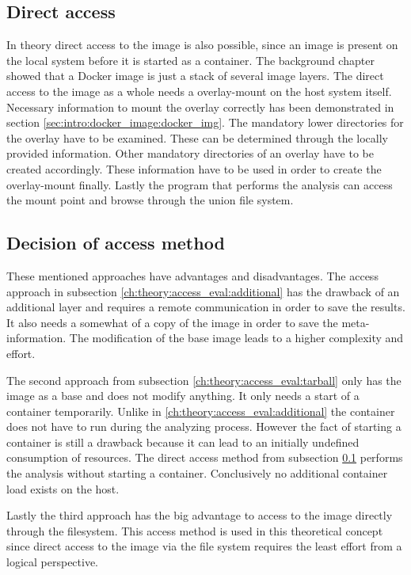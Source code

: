 \subsection{Direct access} 
\label{ch:theory:access_eval:direct_access}
In theory direct access to the image is also possible, since an image is present on the local system before it is started as a container.
The background chapter showed that a Docker image is just a stack of several image layers. 
The direct access to the image as a whole needs a overlay-mount on the host system itself.
Necessary information to mount the overlay correctly has been demonstrated in section \ref{sec:intro:docker_image:docker_img}.
The mandatory lower directories for the overlay have to be examined. 
These can be determined through the locally provided information.
Other mandatory directories of an overlay have to be created accordingly.
These information have to be used in order to create the overlay-mount finally. 
Lastly the program that performs the analysis can access the mount point and browse through the union file system.

\subsection{Decision of access method} 
\label{ch:theory:access_eval:decision_access}
These mentioned approaches have advantages and disadvantages. 	
The access approach in subsection \ref{ch:theory:access_eval:additional} has the drawback of an additional layer and requires a remote communication in order to save the results.
It also needs a somewhat of a copy of the image in order to save the meta-information. 
The modification of the base image leads to a higher complexity and effort. 

The second approach from subsection \ref{ch:theory:access_eval:tarball} only has the image as a base and does not modify anything. 
It only needs a start of a container temporarily. 
Unlike in \ref{ch:theory:access_eval:additional} the container does not have to run during the analyzing process. 
However the fact of starting a container is still a drawback because it can lead to an initially undefined consumption of resources.
The direct access method from subsection \ref{ch:theory:access_eval:direct_access} performs the analysis without starting a container. 
Conclusively no additional container load exists on the host.

Lastly the third approach has the big advantage to access to the image directly through the filesystem. 
This access method is used in this theoretical concept since direct access to the image via the file system requires the least effort from a logical perspective.